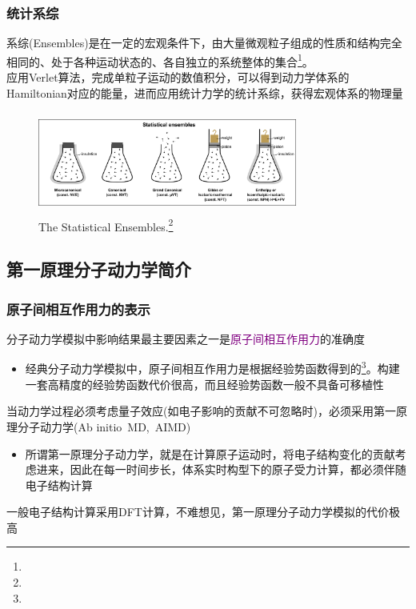 \frame
{
	\frametitle{统计系综}
	系综(\textrm{Ensembles})是在一定的宏观条件下，由大量微观粒子组成的性质和结构完全相同的、处于各种运动状态的、各自独立的系统整体的集合\footnote{\fontsize{4.2pt}{2.2pt}}。\\
	应用\textrm{Verlet}算法，完成单粒子运动的数值积分，可以得到动力学体系的\textrm{Hamiltonian}对应的能量，进而应用统计力学的统计系综，获得宏观体系的物理量
\begin{figure}[h!]
\centering
\vspace*{-0.20in}
\includegraphics[height=1.30in,width=3.35in,viewport=0 0 1420 570,clip]{Figures/Statistical_Ensembles.png}
\caption{\tiny \textrm{The Statistical Ensembles.\footnote{\fontsize{3.5pt}{1.2pt}}}}%
\label{Statistical_Ensembles}
\end{figure}
}

\subsection{第一原理分子动力学简介}
\frame
{
	\frametitle{原子间相互作用力的表示}
	分子动力学模拟中影响结果最主要因素之一是\textcolor{purple}{原子间相互作用力}的准确度
\vskip 5pt
\begin{itemize}
	\item 经典分子动力学模拟中，原子间相互作用力是根据经验势函数得到的\footnote{\fontsize{6.2pt}{4.2pt}\selectfont{经验势函数也称为力场，是参数化形式给出的原子间相互作用，一般通过对实验数据拟合或小体系的第一原理计算得到}}。构建一套高精度的经验势函数代价很高，而且经验势函数一般不具备可移植性
\end{itemize}
\vskip 5pt
	当动力学过程必须考虑量子效应(如电子影响的贡献不可忽略时)，必须采用第一原理分子动力学\textrm{(Ab initio~MD,~AIMD)}
	\begin{itemize}
		\item 所谓第一原理分子动力学，就是在计算原子运动时，将电子结构变化的贡献考虑进来，因此在每一时间步长，体系实时构型下的原子受力计算，都必须伴随电子结构计算
	\end{itemize}
	一般电子结构计算采用\textrm{DFT}计算，不难想见，第一原理分子动力学模拟的代价极高
}

